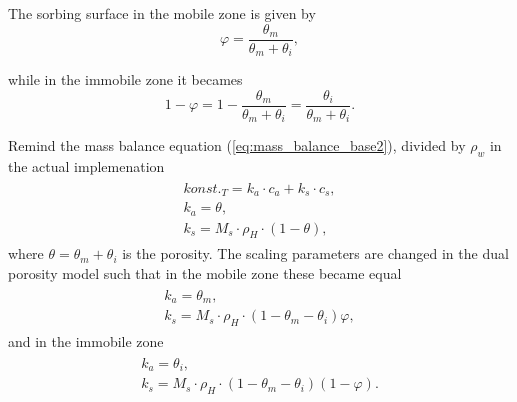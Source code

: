 The sorbing surface in the mobile zone is given by
\begin{equation}
  \varphi = \frac{\theta_m}{\theta_m + \theta_i}, 
\end{equation}

while in the immobile zone it becames
\[ 1 - \varphi = 1-\frac{\theta_m}{\theta_m + \theta_i} = \frac{\theta_i}{\theta_m + \theta_i}. \]

Remind the mass balance equation (\ref{eq:mass_balance_base2}), divided by $\rho_w$ in the actual implemenation
\begin{eqnarray}
 \begin{array}{l}
  konst._T = k_a\cdot c_a + k_s\cdot c_s,\\
  k_a = \theta, \\
  k_s = M_s \cdot\rho_H\cdot(1-\theta),
 \end{array}
 \label{eq:scale_params}
\end{eqnarray}
where $\theta = \theta_m + \theta_i$ is the porosity.
The scaling parameters are changed in the dual porosity model such that in the mobile zone these became equal
\begin{eqnarray}
 \begin{array}{l}
  k_a = \theta_m, \\
  k_s = M_s \cdot\rho_H\cdot(1-\theta_m - \theta_i)\varphi,
 \end{array}
 \label{eq:scale_params_m}
\end{eqnarray}
and in the immobile zone
\begin{eqnarray}
 \begin{array}{l}
  k_a = \theta_i, \\
  k_s = M_s \cdot\rho_H\cdot(1-\theta_m - \theta_i)(1 - \varphi).
 \end{array}
 \label{eq:scale_params_i}
\end{eqnarray}
